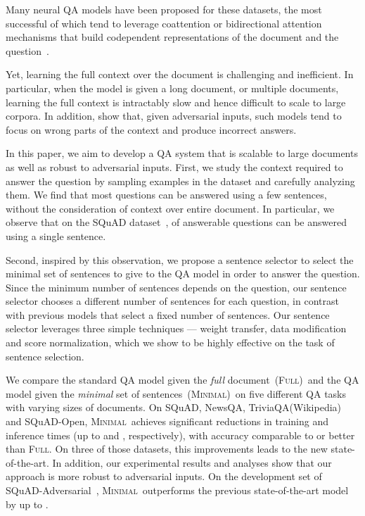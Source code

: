 \documentclass[11pt,a4paper]{article}
\newcommand{\full}{\textsc{Full}}
\newcommand{\ours}{\textsc{Minimal}}
\newcommand{\fullshort}{(\textsc{Full})}
\newcommand{\oursshort}{(\textsc{Minimal})}
\newcommand{\fulllong}{the standard QA model given the {\em full} document}
\newcommand{\ourslong}{the QA model given the {\em minimal} set of sentences}
\begin{document}
Many neural QA models have been proposed for these datasets, the most successful of which tend to leverage coattention or bidirectional attention mechanisms that build codependent representations of the document and the question~\cite{dcn+,bidaf}.

Yet, learning the full context over the document is challenging and inefficient.
In particular, when the model is given a long document, or multiple documents, learning the full context is intractably slow and hence difficult to scale to large corpora.
In addition, \citet{squad-adversarial} show that, given adversarial inputs, such models tend to focus on wrong parts of the context and produce incorrect answers.

In this paper, we aim to develop a QA system that is scalable to large documents as well as robust to adversarial inputs.
First, we study the context required to answer the question by sampling examples in the dataset and carefully analyzing them.
We find that most questions can be answered using a few sentences, without the consideration of context over entire document.
In particular, we observe that on the SQuAD dataset~\cite{squad},  of answerable questions can be answered using a single sentence.

Second, inspired by this observation, we propose a sentence selector to select the minimal set of sentences to give to the QA model in order to answer the question.
Since the minimum number of sentences depends on the question, our sentence selector chooses a different number of sentences for each question, in contrast with previous models that select a fixed number of sentences.
Our sentence selector leverages three simple techniques --- weight transfer, data modification and score normalization, which we show to be highly effective on the task of sentence selection.



We compare \fulllong~\fullshort~and \ourslong~\oursshort~on five different QA tasks with varying sizes of documents.
On SQuAD, NewsQA, TriviaQA(Wikipedia) and SQuAD-Open, \ours~achieves significant reductions in training and inference times (up to  and , respectively), with accuracy comparable to or better than \full. On three of those datasets, this improvements leads to the new state-of-the-art.
In addition, our experimental results and analyses show that our approach is more robust to adversarial inputs. On the development set of SQuAD-Adversarial~\cite{squad-adversarial}, \ours~outperforms the previous state-of-the-art model by up to .
\end{document}
